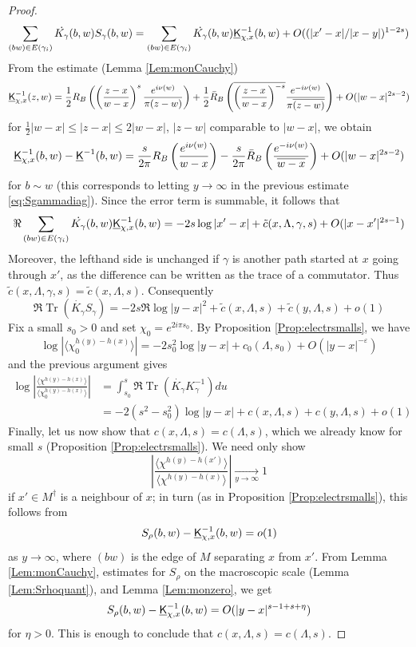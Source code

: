 \documentclass[10pt]{article}
\newcommand{\eps}{\varepsilon}
\newcommand{\uK}{{\underline {\sf K}}}
\newcommand{\dg}{\dagger}
\DeclareMathOperator{\Tr}{Tr}
\begin{document}
\begin{proof}
$$\sum_{(bw)\in E(\gamma_i)} \dot{K_\gamma}(b,w)S_\gamma(b,w)=
\sum_{(bw)\in E(\gamma_i)} \dot{K_\gamma}(b,w)\uK_{\chi,x}^{-1}(b,w)+O((|x'-x|/|x-y|)^{1-2s})$$
From the estimate (Lemma \ref{Lem:monCauchy})
$$\uK_{\chi,x}^{-1}(z,w)=\frac 12R_B\left(\left(\frac{z-x}{w-x}\right)^s\frac{e^{i\nu(w)}}{\pi(z-w)}\right)
+\frac 12\bar R_B\left(\overline{\left(\frac{z-x}{w-x}\right)^{-s}}\frac{e^{-i\nu(w)}}{\pi\overline{(z-w)}}\right)+O(|w-x|^{2s-2})$$
for $\frac 12|w-x|\leq |z-x|\leq 2|w-x|$, $|z-w|$ comparable to $|w-x|$, we obtain 
$$\uK_{\chi,x}^{-1}(b,w)-\uK^{-1}(b,w)=\frac{s}{2\pi}R_B\left(\frac{e^{i\nu(w)}}{w-x}\right)-\frac{s}{2\pi}\bar R_B\left(\frac{e^{-i\nu(w)}}{\overline{w-x}}\right)+O(|w-x|^{2s-2})$$
for $b\sim w$ (this corresponds to letting $y\rightarrow\infty$ in the previous estimate \eqref{eq:Sgammadiag}). Since the error term is summable, it follows that
\begin{equation}\label{eq:Prop:electrpairs0}
\Re\sum_{(bw)\in E(\gamma_i)} \dot{K_\gamma}(b,w)\uK_{\chi,x}^{-1}(b,w)=-2s\log|x'-x|+\tilde c(x,\Lambda,\gamma,s)+O(|x-x'|^{2s-1})
\end{equation}
Moreover, the lefthand side is unchanged if $\gamma$ is another path started at $x$ going through $x'$, as the difference can be written as the trace of a commutator. Thus $\tilde c(x,\Lambda,\gamma,s)=\tilde c(x,\Lambda,s)$. Consequently
$$\Re\Tr(\dot{K_\gamma}S_\gamma)=-2s\Re\log|y-x|^2+\tilde c(x,\Lambda,s)+\tilde c(y,\Lambda,s)+o(1)$$
Fix a small $s_0>0$ and set $\chi_0=e^{2i\pi s_0}$. By Proposition \ref{Prop:electrsmalls}, we have
$$\log|\langle\chi_0^{h(y)-h(x)}\rangle|=-2s_0^2\log|y-x|+c_0(\Lambda,s_0)+O(|y-x|^{-\eps})$$
and the previous argument gives
\begin{align*}
\log\left|\frac{\langle\chi^{h(y)-h(x)}\rangle}{\langle\chi_0^{h(y)-h(x)}\rangle}\right|&=\int_{s_0}^s\Re\Tr(\dot{K_\gamma}K_\gamma^{-1})du\\
&=-2(s^2-s_0^2)\log|y-x|+c(x,\Lambda,s)+c(y,\Lambda,s)+o(1)
\end{align*}
Finally, let us now show that $c(x,\Lambda,s)=c(\Lambda,s)$, which we already know for small $s$ (Proposition \ref{Prop:electrsmalls}). We need only show
$$\left|\frac{\langle\chi^{h(y)-h(x')}\rangle}{\langle\chi^{h(y)-h(x)}\rangle}\right|\underset{y\rightarrow\infty}{\longrightarrow} 1$$
if $x'\in M^\dg$ is a neighbour of $x$; in turn (as in Proposition \ref{Prop:electrsmalls}), this follows from
$$S_\rho(b,w)-\uK_{\chi,x}^{-1}(b,w)=o(1)$$
as $y\rightarrow\infty$, where $(bw)$ is the edge of $M$ separating $x$ from $x'$. From Lemma \ref{Lem:monCauchy}, estimates for $S_\rho$ on the macroscopic scale (Lemma \ref{Lem:Srhoquant}), and Lemma \ref{Lem:monzero}, we get
$$S_\rho(b,w)-\uK_{\chi,x}^{-1}(b,w)=O(|y-x|^{s-1+s+\eta})$$
for $\eta>0$. This is enough to conclude that $c(x,\Lambda,s)=c(\Lambda,s)$.
\end{proof}
\end{document}
